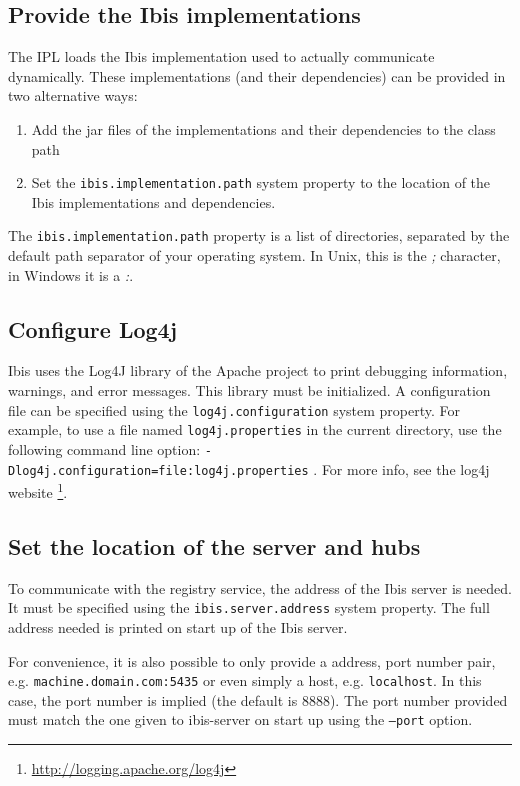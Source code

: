 \documentclass[10pt]{article}
\begin{document}
\subsection{Provide the Ibis implementations}

The IPL loads the Ibis implementation used to actually communicate
dynamically. These implementations (and their dependencies) can be
provided in two alternative ways:

\begin{enumerate} 
\item Add the jar files of the implementations and their dependencies to
      the class path 
\item Set the \texttt{ibis.implementation.path} system property to the
      location of the Ibis implementations and dependencies.  
\end{enumerate}

The \texttt{ibis.implementation.path} property is a list of directories,
separated by the default path separator of your operating system. In
Unix, this is the \emph{;} character, in Windows it is a \emph{:}.

\subsection{Configure Log4j}

Ibis uses the Log4J library of the Apache project to print debugging
information, warnings, and error messages. This library must be
initialized. A configuration file can be specified using the
\texttt{log4j.configuration} system property. For example, to use a file
named \texttt{log4j.properties} in the current directory, use the
following command line option:
\texttt{-Dlog4j.configuration=file:log4j.properties} . For more info,
see the log4j website \footnote{\url{http://logging.apache.org/log4j}}.

\subsection{Set the location of the server and hubs}

To communicate with the registry service, the address of the Ibis server
is needed. It must be specified using the \texttt{ibis.server.address}
system property. The full address needed is printed on start up of the Ibis
server. 

For convenience, it is also possible to only provide a address,
port number pair, e.g. \texttt{machine.domain.com:5435} or even simply a
host, e.g. \texttt{localhost}. In this case, the port number is implied
(the default is 8888). The port number provided must match the one given
to ibis-server on start up using the \texttt{--port} option.
\end{document}
